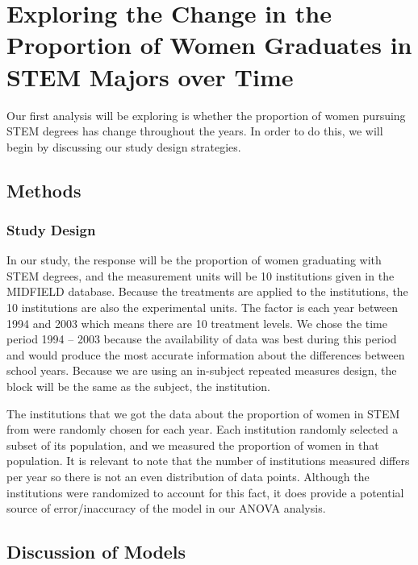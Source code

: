 \documentclass[]{article}
\begin{document}
\section{Exploring the Change in the Proportion of Women Graduates in
STEM Majors over
Time}\label{exploring-the-change-in-the-proportion-of-women-graduates-in-stem-majors-over-time}

Our first analysis will be exploring is whether the proportion of women
pursuing STEM degrees has change throughout the years. In order to do
this, we will begin by discussing our study design strategies.

\subsection{Methods}\label{methods}

\subsubsection{Study Design}\label{study-design}

In our study, the response will be the proportion of women graduating
with STEM degrees, and the measurement units will be 10 institutions
given in the MIDFIELD database. Because the treatments are applied to
the institutions, the 10 institutions are also the experimental units.
The factor is each year between 1994 and 2003 which means there are 10
treatment levels. We chose the time period 1994 -- 2003 because the
availability of data was best during this period and would produce the
most accurate information about the differences between school years.
Because we are using an in-subject repeated measures design, the block
will be the same as the subject, the institution.

The institutions that we got the data about the proportion of women in
STEM from were randomly chosen for each year. Each institution randomly
selected a subset of its population, and we measured the proportion of
women in that population. It is relevant to note that the number of
institutions measured differs per year so there is not an even
distribution of data points. Although the institutions were randomized
to account for this fact, it does provide a potential source of
error/inaccuracy of the model in our ANOVA analysis.

\subsection{Discussion of Models}\label{discussion-of-models}
\end{document}
